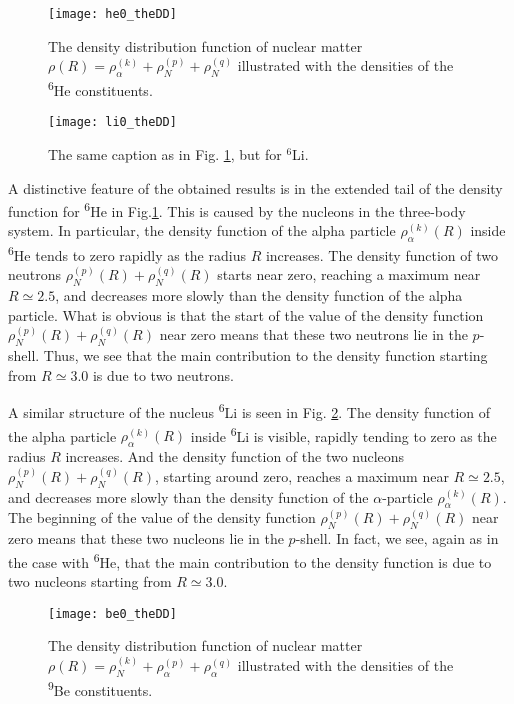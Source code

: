\documentclass[
12pt, %
oneside, %
english, %
onehalfspacing, %
onehalfspacing, %
headsepline, %
]{MastersDoctoralThesis} %
\newcommand{\he}{\textsuperscript{6}He\xspace}
\newcommand{\li}{\textsuperscript{6}Li\xspace}
\newcommand{\be}{\textsuperscript{9}Be\xspace}
\begin{document}
\begin{figure}[tp]
\centering
\texttt{[image: he0\_theDD]}
\decoRule
\caption{  \footnotesize  The density distribution function of nuclear matter $\rho(R)=\rho_{\alpha}^{(k)}+\rho_{N}^{(p)}+\rho_{N}^{(q)}$  illustrated with the densities of the \he constituents. }
\label{he0_theDD}
\end{figure}

\begin{figure}[bp]
\centering
\texttt{[image: li0\_theDD]}
\decoRule
\caption{  \footnotesize  The same caption as in Fig. \ref{he0_theDD}, but for $^6$Li. }
\label{li0_theDD}
\end{figure}

A distinctive feature of the obtained results is in the extended tail of the density function for \he in Fig.\ref{he0_theDD}. This is caused by the nucleons in the three-body system. In particular, the density function of the alpha particle $\rho_\alpha^{(k)}(R)$ inside \he tends to zero rapidly as the radius $R$ increases. The density function of two neutrons $\rho_N^{(p)}(R)+\rho_N^{(q)}(R)$ starts near zero, reaching a maximum near $R \simeq 2.5$, and decreases more slowly than the density function of the alpha particle. What is obvious is that the start of the value of the  density function $\rho_N^{(p)}(R)+\rho_N^{(q)}(R)$ near zero means that these two neutrons lie in the $p$-shell. Thus, we see that the main contribution to the density function starting from $R \simeq 3.0$ is due to two neutrons.

A similar structure of the  nucleus \li is seen in Fig. \ref{li0_theDD}. The density function of the alpha particle $\rho_\alpha^{(k)}(R)$ inside \li is visible, rapidly tending to zero as the radius $R$ increases. And the density function of the two nucleons $\rho_N^{(p)}(R)+\rho_N^{(q)}(R)$, starting around zero, reaches a maximum near $R\simeq 2.5$, and decreases more slowly than the density function of the $\alpha$-particle $\rho_\alpha^{(k)}(R)$.
  The beginning of the value of the density function $\rho_N^{(p)}(R)+\rho_N^{(q)}(R)$ near zero means that these two nucleons lie in the $p$-shell. In fact, we see, again as in the case with \he, that the main contribution to the density function is due to two nucleons starting from $R \simeq 3.0$.

\begin{figure}[tp]
\centering
\texttt{[image: be0\_theDD]}
\decoRule
\caption{  \footnotesize  The density distribution function of nuclear matter $\rho(R)=\rho_{N}^{(k)}+\rho_{\alpha}^{(p)}+\rho_{\alpha}^{(q)}$  illustrated with the densities of the \be constituents. }
\label{be0_theDD}
\end{figure}
\end{document}

